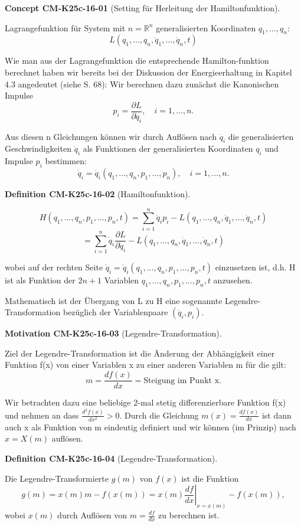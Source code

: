 \documentclass[10pt, letterpaper]{article}
\newcommand{\CustomHeading}[3]{%
  \par\medskip\noindent%
  \textbf{#1 #2} \textnormal{(#3)}.\enskip%
}
\newenvironment{DEF}[2]{\CustomHeading{Definition}{#1}{#2}}{}
\newenvironment{CONC}[2]{\CustomHeading{Concept}{#1}{#2}}{}
\newenvironment{MOT}[2]{\CustomHeading{Motivation}{#1}{#2}}{}
\begin{document}
\begin{CONC}{CM-K25c-16-01}{Setting für Herleitung der Hamiltonfunktion}
Lagrangefunktion für System mit $n=\mathbb{R}^n$ generalisierten Koordinaten $q_1,...,q_n$:
\[
L(q_1,...,q_n,\dot{q}_1,...,\dot{q}_n,t)
\]

Wie man aus der Lagrangefunktion die entsprechende Hamilton-funktion berechnet haben wir bereits bei der Diskussion der Energieerhaltung in Kapitel 4.3 angedeutet (siehe S. 68):
Wir berechnen dazu zunächst die Kanonischen Impulse
\[
p_i = \frac{\partial L}{\partial \dot{q}_i}, \quad i=1,...,n.
\]

Aus diesen n Gleichungen können wir durch Auflösen nach $\dot{q}_i$ die generalisierten Geschwindigkeiten $\dot{q}_i$ als Funktionen der generalisierten Koordinaten $q_i$ und Impulse $p_i$ bestimmen:
\[
\dot{q}_i = \dot{q}_i(q_1,...,q_n,p_1,...,p_n), \quad i=1,...,n.
\]
\end{CONC}

\begin{DEF}{CM-K25c-16-02}{Hamiltonfunktion}
\[
H(q_1,...,q_n,p_1,...,p_n,t) = \sum_{i=1}^n \dot{q}_i p_i - L(q_1,...,q_n,\dot{q}_1,...,\dot{q}_n,t)
\]
\[
= \sum_{i=1}^n \dot{q}_i \frac{\partial L}{\partial \dot{q}_i} - L(q_1,...,q_n,\dot{q}_1,...,\dot{q}_n,t)
\]

wobei auf der rechten Seite $\dot{q}_i = \dot{q}_i(q_1,...,q_n,p_1,...,p_n,t)$ einzusetzen ist, d.h. H ist als Funktion der $2n+1$ Variablen $q_1,...,q_n,p_1,...,p_n,t$ anzusehen.

Mathematisch ist der Übergang von L zu H eine sogenannte Legendre-Transformation bezüglich der Variablenpaare $(\dot{q}_i,p_i)$.
\end{DEF}

\begin{MOT}{CM-K25c-16-03}{Legendre-Transformation}
Ziel der Legendre-Transformation ist die Änderung der Abhängigkeit einer Funktion f(x) von einer Variablen x zu einer anderen Variablen m für die gilt:
\[
m = \frac{df(x)}{dx} = \text{Steigung im Punkt x.}
\]

Wir betrachten dazu eine beliebige 2-mal stetig differenzierbare Funktion f(x) und nehmen an dass $\frac{d^2f(x)}{dx^2} > 0$. Durch die Gleichung $m(x) = \frac{df(x)}{dx}$ ist dann auch x als Funktion von m eindeutig definiert und wir können (im Prinzip) nach $x = X(m)$ auflösen.
\end{MOT}

\begin{DEF}{CM-K25c-16-04}{Legendre-Transformation}
Die Legendre-Transformierte $g(m)$ von $f(x)$ ist die Funktion
\[
g(m) = x(m)m - f(x(m)) = x(m)\left.\frac{df}{dx}\right|_{x=x(m)} - f(x(m)),
\]
wobei $x(m)$ durch Auflösen von $m = \frac{df}{dx}$ zu berechnen ist.
\end{DEF}
\end{document}
